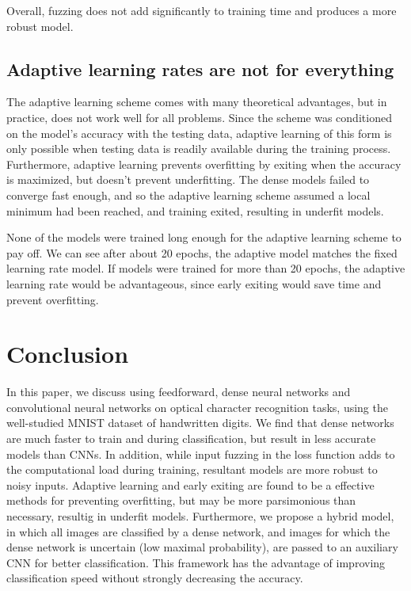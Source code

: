 \documentclass{article}
\begin{document}
Overall, fuzzing does not add significantly to training time and produces a more robust model.

\subsection{Adaptive learning rates are not for everything}

The adaptive learning scheme comes with many theoretical advantages, but in practice, does not work well for all problems.
Since the scheme was conditioned on the model's accuracy with the testing data,
adaptive learning of this form is only possible when testing data is readily available during the training process.
Furthermore, adaptive learning prevents overfitting by exiting when the accuracy is maximized, but doesn't prevent underfitting.
The dense models failed to converge fast enough,
and so the adaptive learning scheme assumed a local minimum had been reached,
and training exited, resulting in underfit models.

None of the models were trained long enough for the adaptive learning scheme to pay off.
We can see after about 20 epochs, the adaptive model matches the fixed learning rate model.
If models were trained for more than 20 epochs, the adaptive learning rate would be advantageous,
since early exiting would save time and prevent overfitting.

\section{Conclusion}

In this paper, we discuss using feedforward, dense neural networks and convolutional neural networks
on optical character recognition tasks, using the well-studied MNIST dataset of handwritten digits.
We find that dense networks are much faster to train and during classification, but result in less accurate models than CNNs.
In addition, while input fuzzing in the loss function adds to the computational load during training,
resultant models are more robust to noisy inputs.
Adaptive learning and early exiting are found to be a effective methods for preventing overfitting,
but may be more parsimonious than necessary, resultig in underfit models.
Furthermore, we propose a hybrid model, in which all images are classified by a dense network,
and images for which the dense network is uncertain (low maximal probability),
are passed to an auxiliary CNN for better classification.
This framework has the advantage of improving classification speed without strongly decreasing the accuracy.


\end{document}

